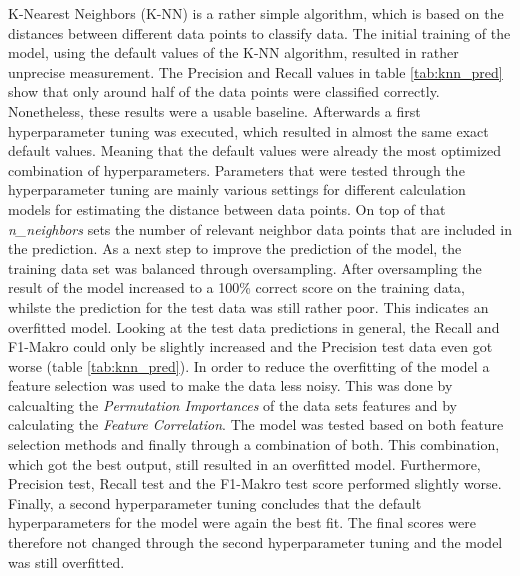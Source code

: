 K-Nearest Neighbors (K-NN) is a rather simple algorithm, which is based on the distances between different data points to classify data. \citep{Yildirim2020} %
The initial training of the model, using the default values of the K-NN algorithm, resulted in rather unprecise measurement. The Precision and Recall values in table \ref{tab:knn_pred} show that only around half of the data points were classified correctly. %
Nonetheless, these results were a usable baseline. Afterwards a first hyperparameter tuning was executed, which resulted in almost the same exact default values. Meaning that the default values were already the most optimized combination of hyperparameters. Parameters that were tested through the hyperparameter tuning are mainly various settings for different calculation models for estimating the distance between data points. On top of that \textit{n\_neighbors} sets the number of relevant neighbor data points that are included in the prediction.
As a next step to improve the prediction of the model, the training data set was balanced through oversampling. After oversampling the result of the model increased to a 100\% correct score on the training data, whilste the prediction for the test data was still rather poor. This indicates an overfitted model. Looking at the test data predictions in general, the Recall and F1-Makro could only be slightly increased and the Precision test data even got worse (table \ref{tab:knn_pred}). %
In order to reduce the overfitting of the model a feature selection was used to make the data less noisy. This was done by calcualting the \textit{Permutation Importances} of the data sets features and by calculating the \textit{Feature Correlation}. The model was tested based on both feature selection methods and finally through a combination of both. This combination, which got the best output, still resulted in an overfitted model. Furthermore, Precision test, Recall test and the F1-Makro test score performed slightly worse. %
Finally, a second hyperparameter tuning concludes that the default hyperparameters for the model were again the best fit. The final scores were therefore not changed through the second hyperparameter tuning and the model was still overfitted. %


